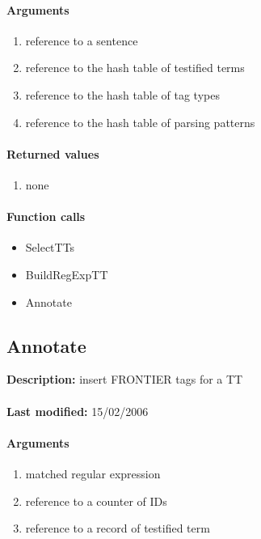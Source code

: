 \paragraph{Arguments}
\begin{enumerate}
\item reference to a sentence
\item reference to the hash table of testified terms
\item reference to the hash table of tag types
\item reference to the hash table of parsing patterns
\end{enumerate}

\paragraph{Returned values}
\begin{enumerate}
\item none
\end{enumerate}

\paragraph{Function calls}
\begin{itemize}
\item SelectTTs
\item BuildRegExpTT
\item Annotate
\end{itemize}

\subsection{Annotate}
\textbf{Description:} insert FRONTIER tags for a TT\\
\\\textbf{Last modified:} 15/02/2006

\paragraph{Arguments}
\begin{enumerate}
\item matched regular expression
\item reference to a counter of IDs
\item reference to a record of testified term
\end{enumerate}

